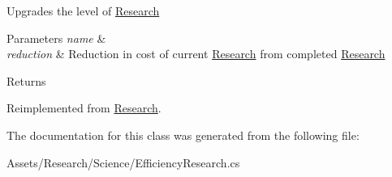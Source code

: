 Upgrades the level of \hyperlink{class_research}{Research} 


\begin{DoxyParams}{Parameters}
{\em name} & \\
\hline
{\em reduction} & Reduction in cost of current \hyperlink{class_research}{Research} from completed \hyperlink{class_research}{Research}\\
\hline
\end{DoxyParams}
\begin{DoxyReturn}{Returns}

\end{DoxyReturn}


Reimplemented from \hyperlink{class_research_a963cb6ac5e27b234a3da2b1be640bc6a}{Research}.



The documentation for this class was generated from the following file\+:\begin{DoxyCompactItemize}
\item 
Assets/\+Research/\+Science/Efficiency\+Research.\+cs\end{DoxyCompactItemize}
